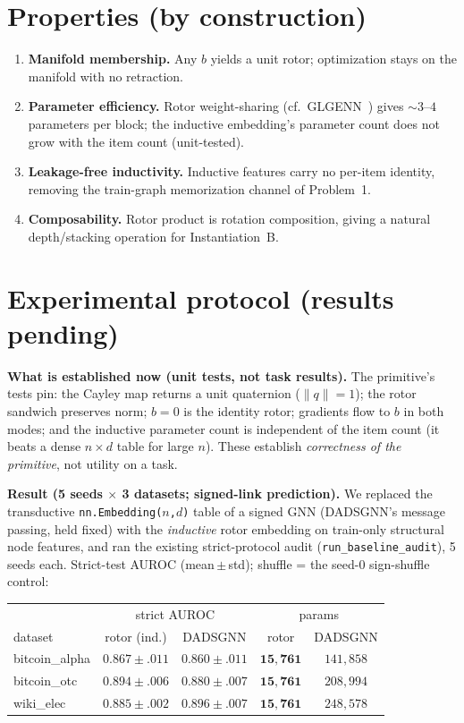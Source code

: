 \documentclass[11pt]{article}
\begin{document}
\section{Properties (by construction)}
\label{sec:props}
\begin{enumerate}[nosep,label=\textbf{P\arabic*}]
  \item \textbf{Manifold membership.} Any $b$ yields a unit rotor; optimization
        stays on the manifold with no retraction.
  \item \textbf{Parameter efficiency.} Rotor weight-sharing (cf.\
        GLGENN~\cite{filimoshina2025glgenn}) gives $\sim 3$--$4$ parameters per
        block; the inductive embedding's parameter count does not grow with the
        item count (unit-tested).
  \item \textbf{Leakage-free inductivity.} Inductive features carry no per-item
        identity, removing the train-graph memorization channel of Problem~1.
  \item \textbf{Composability.} Rotor product is rotation composition, giving a
        natural depth/stacking operation for Instantiation~B.
\end{enumerate}

\section{Experimental protocol (results pending)}
\label{sec:exp}
\textbf{What is established now (unit tests, not task results).} The primitive's
tests pin: the Cayley map returns a unit quaternion ($\lVert q\rVert=1$); the rotor
sandwich preserves norm; $b=0$ is the identity rotor; gradients flow to $b$ in both
modes; and the inductive parameter count is independent of the item count (it beats
a dense $n{\times}d$ table for large $n$). These establish \emph{correctness of the
primitive}, not utility on a task.

\textbf{Result (5 seeds $\times$ 3 datasets; signed-link prediction).} We replaced
the transductive \texttt{nn.Embedding($n$,$d$)} table of a signed GNN (DADSGNN's
message passing, held fixed) with the \emph{inductive} rotor embedding on
train-only structural node features, and ran the existing strict-protocol audit
(\texttt{run\_baseline\_audit}), 5 seeds each. Strict-test AUROC (mean\,$\pm$\,std);
shuffle = the seed-0 sign-shuffle control:

\begin{center}\small
\begin{tabular}{lcccc}
\toprule
& \multicolumn{2}{c}{strict AUROC} & \multicolumn{2}{c}{params}\\
dataset & rotor (ind.) & DADSGNN & rotor & DADSGNN\\
\midrule
bitcoin\_alpha & $\mathbf{0.867{\pm}.011}$ & $0.860{\pm}.011$ & $\mathbf{15{,}761}$ & $141{,}858$\\
bitcoin\_otc   & $\mathbf{0.894{\pm}.006}$ & $0.880{\pm}.007$ & $\mathbf{15{,}761}$ & $208{,}994$\\
wiki\_elec     & $0.885{\pm}.002$ & $\mathbf{0.896{\pm}.007}$ & $\mathbf{15{,}761}$ & $248{,}578$\\
\bottomrule
\end{tabular}
\end{center}
\end{document}
